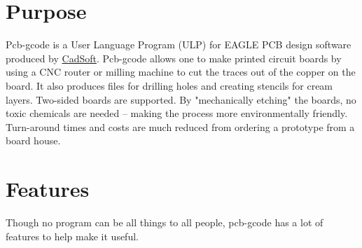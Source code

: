 \documentclass[11pt]{book}
\begin{document}
%
%
\section{Purpose}\label{sec:Purpose}

Pcb-gcode is a User Language Program (ULP) for EAGLE PCB design software produced by \href{http://cadsoftusa.com}{CadSoft}. Pcb-gcode allows one to make printed circuit boards by using a CNC router or milling machine to cut the traces out of the copper on the board. It also produces files for drilling holes and creating stencils for cream layers. Two-sided boards are supported. By "mechanically etching" the boards, no toxic chemicals are needed -- making the process more environmentally friendly. Turn-around times and costs are much reduced from ordering a prototype from a board house.

%
%
\section{Features}\label{sec:Features}

Though no program can be all things to all people, pcb-gcode has a lot of features to help make it useful.
\end{document}
